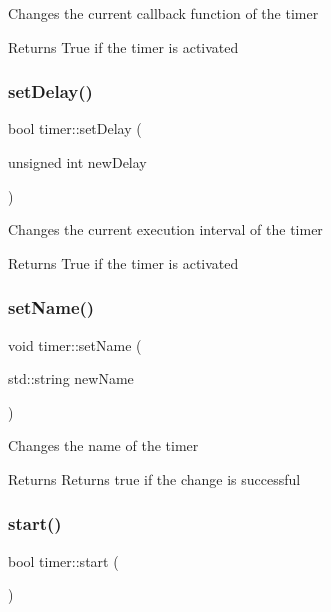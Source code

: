 Changes the current callback function of the timer \begin{DoxyReturn}{Returns}
True if the timer is activated 
\end{DoxyReturn}
\mbox{\label{classtimer_acd8ddd948bf96185cf3c1e0a4cf60264}} 
\subsubsection{\texorpdfstring{set\+Delay()}{setDelay()}}
{\footnotesize\ttfamily bool timer\+::set\+Delay (\begin{DoxyParamCaption}\item[{unsigned int}]{new\+Delay }\end{DoxyParamCaption})}

Changes the current execution interval of the timer \begin{DoxyReturn}{Returns}
True if the timer is activated 
\end{DoxyReturn}
\mbox{\label{classtimer_ae3dce84bbcd9a7022a20e2b63174aa61}} 
\subsubsection{\texorpdfstring{set\+Name()}{setName()}}
{\footnotesize\ttfamily void timer\+::set\+Name (\begin{DoxyParamCaption}\item[{std\+::string}]{new\+Name }\end{DoxyParamCaption})}

Changes the name of the timer \begin{DoxyReturn}{Returns}
Returns true if the change is successful 
\end{DoxyReturn}
\mbox{\label{classtimer_adad85b4705278d4cb8a2a4f3286cc2c7}} 
\subsubsection{\texorpdfstring{start()}{start()}}
{\footnotesize\ttfamily bool timer\+::start (\begin{DoxyParamCaption}{ }\end{DoxyParamCaption})}

